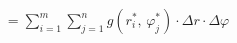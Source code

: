 \documentclass[preview]{standalone}
\begin{document}
\begin{align*}
&= \sum_{i=1}^m \sum_{j=1}^n g\left(r_i^*,\, \varphi_j^*\right)\cdot \Delta r \cdot \Delta \varphi \\
\end{align*}
\end{document}

